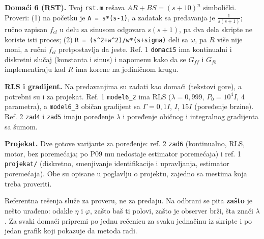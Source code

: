 \documentclass[11pt,a4paper,parskip=half,headsepline,numbers=noenddot]{scrartcl}
\begin{document}
\textbf{Domaći 6 (RST).} Tvoj \texttt{rst.m} rešava \(AR + BS = (s+10)^n\) simbolički. Proveri: (1) na početku je \texttt{A\ =\ s*(\allowbreak{}s-1)}, a zadatak sa predavanja je \(\frac{1}{s(s+1)}\); ručno zapisan \(f_{cl}\) u delu sa sinusom odgovara \(s(s+1)\), pa dva dela skripte ne koriste isti proces; (2) \texttt{R\ =\ (\allowbreak{}s\^{}2+w\^{}2)/\allowbreak{}w*(\allowbreak{}s+sigma)} deli sa \(\omega\), pa \(R\) više nije moni, a ručni \(f_{cl}\) pretpostavlja da jeste. Ref. 1 \texttt{domaci5} ima kontinualni i diskretni slučaj (konstanta i sinus) i napomenu kako da se \(G_{ff}\) i \(G_{fb}\) implementiraju kad \(R\) ima korene na jediničnom krugu.

\textbf{RLS i gradijent.} Na predavanjima su zadati kao domaći (tekstovi gore), a potrebni su i za projekat. Ref. 1 \texttt{model6\_2} ima RLS (\(\lambda = 0{,}999\), \(P_0 = 10^4I\), 4 parametra), a \texttt{model6\_3} običan gradijent sa \(\Gamma = 0{,}1I\), \(I\), \(15I\) (poređenje brzine). Ref. 2 \texttt{zad4} i \texttt{zad5} imaju poređenje \(\lambda\) i poređenje običnog i integralnog gradijenta sa šumom.

\textbf{Projekat.} Dve gotove varijante za poređenje: ref. 2 \texttt{zad6} (kontinualno, RLS, motor, bez poremećaja; po P09 mu nedostaje estimator poremećaja) i ref. 1 \texttt{projekat/} (diskretno, smenjivanje identifikacije i upravljanja, estimator poremećaja). Obe su opisane u poglavlju o projektu, zajedno sa mestima koja treba proveriti.

\begin{ispit}
Referentna rešenja služe za proveru, ne za predaju. Na odbrani se pita \textbf{zašto} je nešto urađeno: odakle \(\eta\) i \(\varphi\), zašto baš ti polovi, zašto je observer brži, šta znači \(\lambda\). Za svaki domaći pripremi po jednu rečenicu za svaku jednačinu iz skripte i po jedan grafik koji pokazuje da metoda radi.
\end{ispit}
\end{document}
